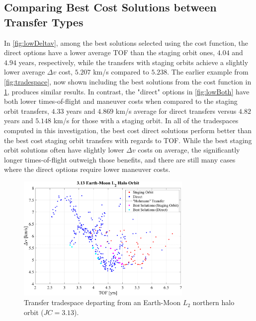 \subsection{Comparing Best Cost Solutions between Transfer Types}
In \cref{fig:lowDeltav}, among the best solutions selected using the cost function, the direct
options have a lower average TOF than the staging orbit ones, $4.04$ and $4.94$ years,
respectively, while the transfers with staging orbits achieve a slightly lower average $\Delta v$
cost, $5.207$ km/s compared to $5.238$. The earlier example from \cref{fig:tradespace}, now shown
including the best solutions from the cost function in \cref{fig:costTradespace}, produces similar
results. In contrast, the "direct" options in \cref{fig:lowBoth} have both lower times-of-flight
and maneuver costs when compared to the staging orbit transfers, $4.33$ years and $4.869$ km/s
average for direct transfers versus $4.82$ years and $5.148$ km/s for those with a staging orbit.
In all of the tradespaces computed in this investigation, the best cost direct solutions perform
better than the best cost staging orbit transfers with regards to TOF. While the best staging orbit
solutions often have slightly lower $\Delta v$ costs on average, the significantly longer
times-of-flight outweigh those benefits, and there are still many cases where the direct options
require lower maneuver costs.

\begin{figure}[ht]
    \centering
    \includegraphics[width=0.75\textwidth]{figures/TradeSpace_L2Halo_3_13.pdf}
    \caption{Transfer tradespace departing from an Earth-Moon $L_{2}$ northern halo orbit ($JC=3.13$).}
    \label{fig:costTradespace}
\end{figure}

